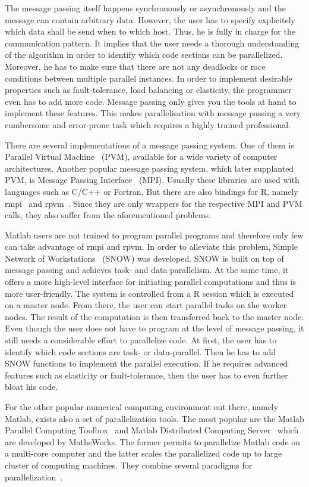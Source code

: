 The message passing itself happens synchronously or asynchronously and the message can contain arbitrary data.
However, the user has to specify explicitely which data shall be send when to which host.
Thus, he is fully in charge for the communication pattern.
It implies that the user needs a thorough understanding of the algorithm in order to identify which code sections can be parallelized.
Moreover, he has to make sure that there are not any deadlocks or race conditions between multiple parallel instances.
In order to implement desirable properties such as fault-tolerance, load balancing or elasticity, the programmer even has to add more code.
Message passing only gives you the tools at hand to implement these features.
This makes parallelisation with message passing a very cumbersome and error-prone task which requires a highly trained professional.

There are several implementations of a message passing system.
One of them is Parallel Virtual Machine~\cite{geist:1994a} (PVM), available for a wide variety of computer architectures.
Another popular message passing system, which later supplanted PVM, is Message Passing Interface~\cite{lusk:2009a} (MPI).
Usually these libraries are used with languages such as C/C++ or Fortran.
But there are also bindings for R, namely rmpi~\cite{rmpi} and rpvm~\cite{rpvm}.
Since they are only wrappers for the respective MPI and PVM calls, they also suffer from the aforementioned problems.

Matlab users are not trained to program parallel programs and therefore only few can take advantage of rmpi and rpvm.
In order to alleviate this problem, Simple Network of Workstations~\cite{tierney:pv0hros2008a} (SNOW) was developed.
SNOW is built on top of message passing and achieves task- and data-parallelism.
At the same time, it offers a more high-level interface for initiating parallel computations and thus is more user-friendly.
The system is controlled from a R session which is executed on a master node.
From there, the user can start parallel tasks on the worker nodes.
The result of the computation is then transferred back to the master node.
Even though the user does not have to program at the level of message passing, it still needs a considerable effort to parallelize code.
At first, the user has to identify which code sections are task- or data-parallel.
Then he has to add SNOW functions to implement the parallel execution.
If he requires advanced features such as elasticity or fault-tolerance, then the user has to even further bloat his code.

For the other popular numerical computing environment out there, namely Matlab, exists also a set of parallelization tools.
The most popular are the Matlab Parallel Computing Toolbox~\cite{parallelComputingToolbox} and Matlab Distributed Computing Server~\cite{distributedComputingServer} which are developed by MathsWorks.
The former permits to parallelize Matlab code on a multi-core computer and the latter scales the parallelized code up to large cluster of computing machines.
They combine several paradigms for parallelization~\cite{sharma:ijpp2009a}.
